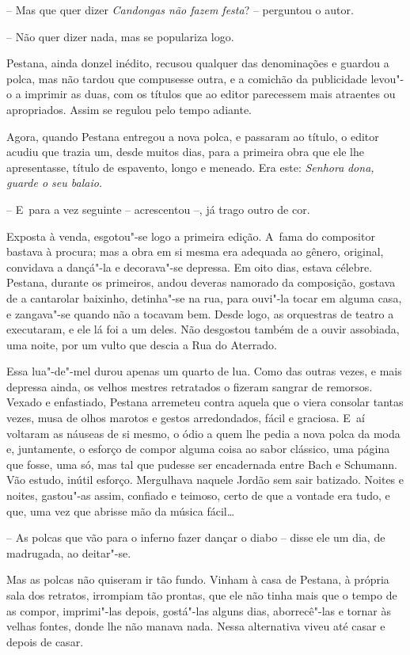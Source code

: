 -- Mas que quer dizer \emph{Candongas não fazem festa}? -- perguntou o
autor.

-- Não quer dizer nada, mas se populariza logo.

Pestana, ainda donzel inédito, recusou qualquer das denominações e
guardou a polca, mas não tardou que compusesse outra, e a comichão da
publicidade levou"-o a imprimir as duas, com os títulos que ao editor
parecessem mais atraentes ou apropriados. Assim se regulou pelo tempo
adiante.

Agora, quando Pestana entregou a nova polca, e passaram ao título, o
editor acudiu que trazia um, desde muitos dias, para a primeira obra que
ele lhe apresentasse, título de espavento, longo e meneado. Era este:
\emph{Senhora} \emph{dona, guarde o seu balaio.}

-- E~para a vez seguinte -- acrescentou --, já trago outro de cor.

Exposta à venda, esgotou"-se logo a primeira edição. A~fama do compositor
bastava à procura; mas a obra em si mesma era adequada ao gênero,
original, convidava a dançá"-la e decorava"-se depressa. Em oito dias,
estava célebre. Pestana, durante os primeiros, andou deveras namorado da
composição, gostava de a cantarolar baixinho, detinha"-se na rua, para
ouvi"-la tocar em alguma casa, e zangava"-se quando não a tocavam bem.
Desde logo, as orquestras de teatro a executaram, e ele lá foi a um
deles. Não desgostou também de a ouvir assobiada, uma noite, por um
vulto que descia a Rua do Aterrado.

Essa lua"-de"-mel durou apenas um quarto de lua. Como das outras vezes, e
mais depressa ainda, os velhos mestres retratados o fizeram sangrar de
remorsos. Vexado e enfastiado, Pestana arremeteu contra aquela que o
viera consolar tantas vezes, musa de olhos marotos e gestos
arredondados, fácil e graciosa. E~aí voltaram as náuseas de si mesmo, o
ódio a quem lhe pedia a nova polca da moda e, juntamente, o esforço de
compor alguma coisa ao sabor clássico, uma página que fosse, uma só, mas
tal que pudesse ser encadernada entre Bach e Schumann. Vão estudo,
inútil esforço. Mergulhava naquele Jordão sem sair batizado. Noites e
noites, gastou"-as assim, confiado e teimoso, certo de que a vontade era
tudo, e que, uma vez que abrisse mão da música fácil\ldots{}

-- As polcas que vão para o inferno fazer dançar o diabo -- disse ele um
dia, de madrugada, ao deitar"-se.

Mas as polcas não quiseram ir tão fundo. Vinham à casa de Pestana, à
própria sala dos retratos, irrompiam tão prontas, que ele não tinha mais
que o tempo de as compor, imprimi"-las depois, gostá"-las alguns dias,
aborrecê"-las e tornar às velhas fontes, donde lhe não manava nada. Nessa
alternativa viveu até casar e depois de casar.

